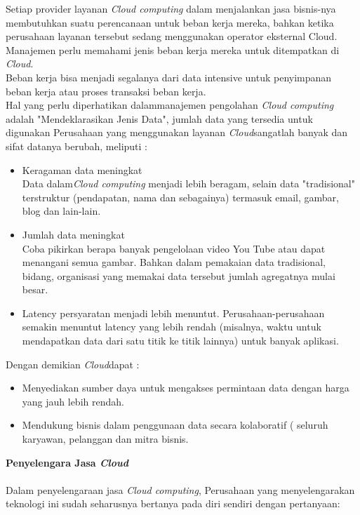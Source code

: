 \tab Setiap provider layanan \textit{Cloud computing} dalam menjalankan jasa bisnis-nya membutuhkan suatu perencanaan untuk beban kerja mereka, bahkan  ketika  perusahaan layanan tersebut sedang menggunakan operator eksternal Cloud. Manajemen perlu memahami jenis beban kerja mereka untuk ditempatkan di \textit{Cloud}.\\
Beban kerja bisa menjadi segalanya dari data intensive untuk penyimpanan beban kerja atau proses transaksi  beban kerja.\\
\tab Hal yang perlu diperhatikan dalammanajemen pengolahan \textit{Cloud computing} adalah
"Mendeklarasikan Jenis Data", jumlah data yang tersedia untuk digunakan Perusahaan yang menggunakan layanan \textit{Cloud}sangatlah banyak dan sifat datanya berubah,  meliputi :\\
\begin{itemize}
\item Keragaman data meningkat\\
Data dalam\textit{Cloud computing} menjadi lebih beragam, selain data "tradisional" terstruktur (pendapatan, nama dan sebagainya) termasuk email, gambar,  blog dan lain-lain.
\item Jumlah data meningkat\\
Coba pikirkan berapa banyak pengelolaan video You Tube atau dapat menangani semua gambar. Bahkan dalam pemakaian data tradisional, bidang, organisasi yang memakai data tersebut jumlah agregatnya mulai besar.
\item Latency persyaratan menjadi lebih  menuntut. 
Perusahaan-perusahaan  semakin menuntut latency yang lebih rendah (misalnya, waktu untuk mendapatkan data dari satu titik ke titik lainnya) untuk banyak aplikasi.
\end{itemize}
Dengan demikian  \textit{Cloud}dapat :\\
\begin{itemize}
\item Menyediakan sumber daya untuk mengakses permintaan data dengan harga  yang  jauh lebih rendah.
\item Mendukung bisnis dalam penggunaan data secara kolaboratif ( seluruh  karyawan, pelanggan dan mitra bisnis.
\end{itemize}
\textbf{Penyelengara Jasa \textit{Cloud}}\\\\
\tab Dalam penyelengaraan jasa \textit{Cloud computing}, Perusahaan yang menyelengarakan teknologi  ini sudah seharusnya bertanya pada diri sendiri dengan pertanyaan:\\
